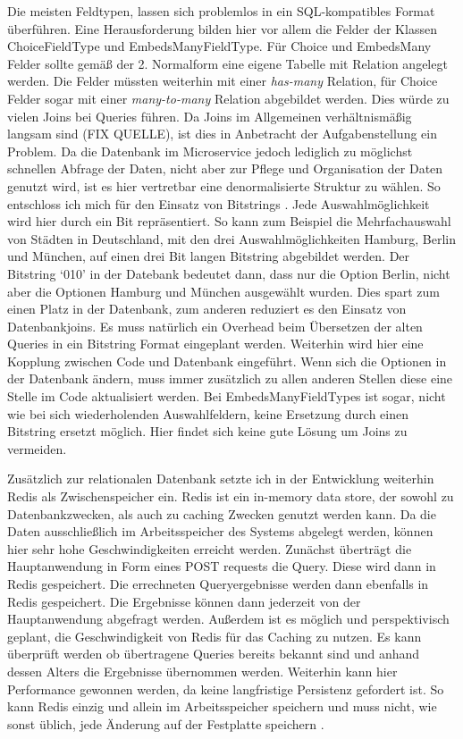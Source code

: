 Die meisten Feldtypen, lassen sich problemlos in ein SQL-kompatibles Format überführen. 
Eine Herausforderung bilden hier vor allem die Felder der Klassen ChoiceFieldType und EmbedsManyFieldType. Für Choice und EmbedsMany Felder sollte gemäß der 2. Normalform \cite{db:normalform} eine eigene Tabelle mit Relation angelegt werden. Die  Felder müssten weiterhin mit einer \textit{has-many} Relation, für Choice Felder sogar mit einer \textit{many-to-many} Relation abgebildet werden. Dies würde zu vielen Joins bei Queries führen. Da Joins im Allgemeinen verhältnismäßig langsam sind (FIX QUELLE), ist dies in Anbetracht der Aufgabenstellung ein Problem. Da die Datenbank im Microservice jedoch lediglich zu möglichst schnellen Abfrage der Daten, nicht aber zur Pflege und Organisation der Daten genutzt wird, ist es hier vertretbar eine denormalisierte Struktur zu wählen. So entschloss ich mich für den Einsatz von Bitstrings \cite{postgres:bitstring}. Jede Auswahlmöglichkeit wird hier durch ein Bit repräsentiert. So kann zum Beispiel die Mehrfachauswahl von Städten in Deutschland, mit den drei Auswahlmöglichkeiten Hamburg, Berlin und München, auf einen drei Bit langen Bitstring abgebildet werden. Der Bitstring `010' in der Datebank bedeutet dann, dass nur die Option Berlin, nicht aber die Optionen Hamburg und München ausgewählt wurden. Dies spart zum einen Platz in der Datenbank, zum anderen reduziert es den Einsatz von Datenbankjoins. Es muss natürlich ein Overhead beim Übersetzen der alten Queries in ein Bitstring Format eingeplant werden. Weiterhin wird hier eine Kopplung zwischen Code und Datenbank eingeführt. Wenn sich die Optionen in der Datenbank ändern, muss immer zusätzlich zu allen anderen Stellen diese eine Stelle im Code aktualisiert werden.
Bei EmbedsManyFieldTypes ist sogar, nicht wie bei sich wiederholenden Auswahlfeldern, keine Ersetzung durch einen Bitstring ersetzt möglich. Hier findet sich keine gute Lösung um Joins zu vermeiden.


Zusätzlich zur relationalen Datenbank setzte ich in der Entwicklung weiterhin Redis\cite{redis} als Zwischenspeicher ein. Redis ist ein in-memory data store, der sowohl zu Datenbankzwecken, als auch zu caching Zwecken genutzt werden kann. Da die Daten ausschließlich im Arbeitsspeicher des Systems abgelegt werden, können hier sehr hohe Geschwindigkeiten erreicht werden.
Zunächst überträgt die Hauptanwendung in Form eines POST requests die Query. Diese wird dann in Redis gespeichert. Die errechneten Queryergebnisse werden dann ebenfalls in Redis gespeichert. Die Ergebnisse können dann jederzeit von der Hauptanwendung abgefragt werden. Außerdem ist es möglich und perspektivisch geplant, die Geschwindigkeit von Redis für das Caching zu nutzen. Es kann überprüft werden ob übertragene Queries bereits bekannt sind und anhand dessen Alters die Ergebnisse übernommen werden. Weiterhin kann hier Performance gewonnen werden, da keine langfristige Persistenz gefordert ist. So kann Redis einzig und allein im Arbeitsspeicher speichern und muss nicht, wie sonst üblich, jede Änderung auf der Festplatte speichern \cite{redis:faq}.

